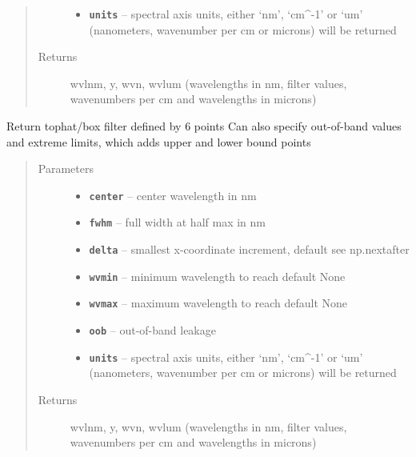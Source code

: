 \documentclass[a4paper,10pt,english]{sphinxmanual}
\begin{document}
\begin{fulllineitems}
\begin{quote}
\begin{description}
\begin{itemize}
\item {} 
\textbf{\texttt{units}} -- spectral axis units, either `nm', `cm\textasciicircum{}-1' or `um' (nanometers, wavenumber per cm or microns)
will be returned

\end{itemize}

\item[{Returns}] \leavevmode
wvlnm, y, wvn, wvlum (wavelengths in nm, filter values, wavenumbers per cm and wavelengths in microns)

\end{description}\end{quote}

\end{fulllineitems}


\begin{fulllineitems}
\label{packages:radute.tophat}
Return tophat/box filter defined by 6 points
Can also specify out-of-band values and extreme limits, which adds upper and lower bound points
\begin{quote}\begin{description}
\item[{Parameters}] \leavevmode\begin{itemize}
\item {} 
\textbf{\texttt{center}} -- center wavelength in nm

\item {} 
\textbf{\texttt{fwhm}} -- full width at half max in nm

\item {} 
\textbf{\texttt{delta}} -- smallest x-coordinate increment, default see np.nextafter

\item {} 
\textbf{\texttt{wvmin}} -- minimum wavelength to reach default None

\item {} 
\textbf{\texttt{wvmax}} -- maximum wavelength to reach default None

\item {} 
\textbf{\texttt{oob}} -- out-of-band leakage

\item {} 
\textbf{\texttt{units}} -- spectral axis units, either `nm', `cm\textasciicircum{}-1' or `um' (nanometers, wavenumber per cm or microns)
will be returned

\end{itemize}

\item[{Returns}] \leavevmode
wvlnm, y, wvn, wvlum (wavelengths in nm, filter values, wavenumbers per cm and wavelengths in microns)

\end{description}\end{quote}

\end{fulllineitems}
\end{document}
